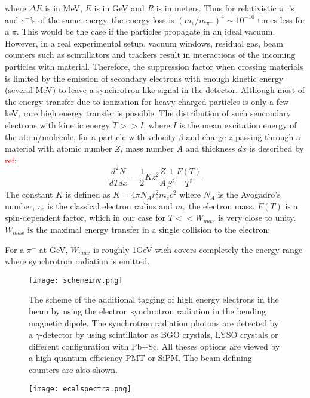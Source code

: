 where $\Delta E$ is in \unit{MeV}, $E$ is in \unit{GeV} and $R$ is in meters. Thus for relativistic $\pi^-$'s and $e^-$'s
of the same energy, the energy loss is $(m_e/m_{\pi^-})^4\sim 10^{-10}$ times less for a $\pi$. This would be the case
if the particles propagate in an ideal vacuum. However, in a real experimental setup, vacuum windows, residual gas, beam
	counters such as scintillators and trackers result in interactions of the incoming particles with material. Therefore,
	the suppression factor when crossing materials is limited by the emission of secondary electrons with enough kinetic
	energy (several MeV) to leave a synchrotron-like signal in the detector. Although most of the energy transfer due to
	ionization for heavy charged particles is only a few keV, rare high energy transfer is possible. The distribution of
	such sencondary electrons with kinetic energy $T>>I$, where $I$ is the mean excitation energy of the atom/molecule,
	for a particle with velocity $\beta$ and charge $z$ passing through a material with atomic number $Z$, mass number $A$
		and thickness $dx$ is described by \textcolor{red}{ref}:
\begin{equation}
\frac{d^2N}{dTdx}=\frac{1}{2}Kz^2\frac{Z}{A}\frac{1}{\beta^2}\frac{F(T)}{T^2}
\end{equation}
The constant $K$ is defined as $K=4\pi N_A r^2_em_ec^2$ where $N_A$ is the Avogadro's number, $r_e$ is the classical
electron radius and $m_e$ the electron mass. $F(T)$ is a spin-dependent factor, which in our case for $T<<W_{max}$ is
very close to unity. $W_{max}$ is the maximal energy transfer in a single collision to the electron:

For a $\pi^-$ at \si{\giga\electronvolt}, $W_{max}$ is roughly 1\si{\giga\electronvolt} wich covers completely the
energy range where synchrotron radiation is emitted. 





\begin{figure}[ht]
	\hspace*{\fill}
	\centering
	\texttt{[image: schemeinv.png]}
	\hspace*{\fill}
	\caption{The scheme of the additional tagging of high energy electrons in the beam by using the electron synchrotron
	radiation in the bending magnetic dipole. The synchrotron radiation photons are detected by a $\gamma$-detector by
	using scintillator as BGO crystals, LYSO crystals or different configuration with Pb+Sc. All theses options are viewed
	by a high quantum efficiency PMT or SiPM. The beam defining counters are also shown.}
	\label{fig:schemeinv}
\end{figure}
\begin{figure}[ht]
	\hspace*{\fill}
	\centering
	\texttt{[image: ecalspectra.png]}
	\hspace*{\fill}
	\caption{}\label{ecalspectra}
\end{figure}

